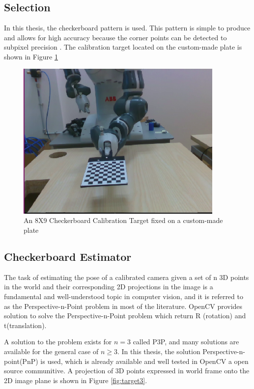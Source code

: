 \subsection{Selection}
In this thesis, the checkerboard pattern is used.  This pattern is simple to produce and allows for high accuracy because the corner points can be detected to subpixel precision \cite{planarTargets}. The calibration target located on the custom-made plate is shown in Figure \ref{fig:target2}


\begin{figure}[!h]
\begin{center}
\includegraphics[width=4in]{figures03/target1.png}
\caption{An 8X9 Checkerboard Calibration Target fixed on a custom-made plate}
\label{fig:target2}
\end{center}
\end{figure}

\subsection{Checkerboard Estimator}\label{pose1}

The task of estimating the pose of a calibrated camera given a set of n 3D points in the world and their corresponding 2D projections in the image is a fundamental and well-understood topic in computer vision, and it is referred to as the Perspective-n-Point problem in most of the literature. OpenCV provides solution to solve the Perspective-n-Point problem which return R (rotation) and t(translation).  

A solution to the problem exists for $n = 3$ called P3P, and many solutions are available for the general case of $n\geq 3$. In this thesis, the solution Perspective-n-point(PnP) \cite{pnp} is used, which is already available and well tested in OpenCV a open source communitive. A projection of 3D points expressed in world frame onto the 2D image plane is shown in Figure \ref{fig:target3}.


